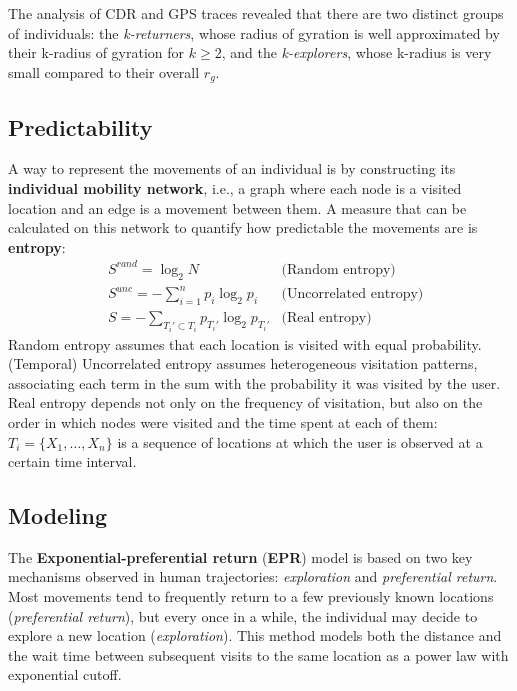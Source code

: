 The analysis of CDR and GPS traces revealed that there are two distinct groups of individuals: the \textit{k-returners}, whose radius of gyration is well approximated by their k-radius of gyration for $k \geq 2$, and the \textit{k-explorers}, whose k-radius is very small compared to their overall $r_g$.

\subsection{Predictability}
A way to represent the movements of an individual is by constructing its \textbf{individual mobility network}, i.e., a graph where each node is a visited location and an edge is a movement between them. A measure that can be calculated on this network to quantify how predictable the movements are is \textbf{entropy}:
\begin{align*}
    &S^{\textit{rand}} = \log_2 N &\text{(Random entropy)} \\
    &S^{\textit{unc}} = - \sum_{i=1}^n p_i \log_2 p_i &\text{(Uncorrelated entropy)} \\
    &S = -\sum_{T_i' \subset T_i} p_{T_i'} \log_2 p_{T_i'} &\text{(Real entropy)}
\end{align*}
Random entropy assumes that each location is visited with equal probability. (Temporal) Uncorrelated entropy assumes heterogeneous visitation patterns, associating each term in the sum with the probability it was visited by the user. Real entropy depends not only on the frequency of visitation, but also on the order in which nodes were visited and the time spent at each of them: $T_i = \{X_1, \dots, X_n\}$ is a sequence of locations at which the user is observed at a certain time interval.

\subsection{Modeling}

The \textbf{Exponential-preferential return} (\textbf{EPR}) model is based on two key mechanisms observed in human trajectories: \textit{exploration} and \textit{preferential return}. Most movements tend to frequently return to a few previously known locations (\textit{preferential return}), but every once in a while, the individual may decide to explore a new location (\textit{exploration}). This method models both the distance and the wait time between subsequent visits to the same location as a power law with exponential cutoff.

